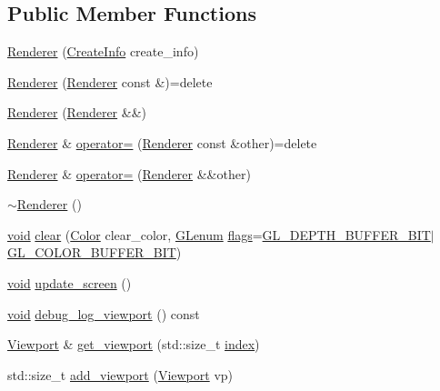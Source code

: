 \subsection*{Public Member Functions}
\begin{DoxyCompactItemize}
\item 
\mbox{\hyperlink{class_saturn_1_1_renderer_a15cfd7d5ff3e992daebf52b81e6f3168}{Renderer}} (\mbox{\hyperlink{struct_saturn_1_1_renderer_1_1_create_info}{Create\+Info}} create\+\_\+info)
\item 
\mbox{\hyperlink{class_saturn_1_1_renderer_ad83d9c451cfdcb522e67909fb5b8f41b}{Renderer}} (\mbox{\hyperlink{class_saturn_1_1_renderer}{Renderer}} const \&)=delete
\item 
\mbox{\hyperlink{class_saturn_1_1_renderer_a4ef1880dcbcd08a0577bf94848685e96}{Renderer}} (\mbox{\hyperlink{class_saturn_1_1_renderer}{Renderer}} \&\&)
\item 
\mbox{\hyperlink{class_saturn_1_1_renderer}{Renderer}} \& \mbox{\hyperlink{class_saturn_1_1_renderer_aa07681b99dac69ffa21d515a17a60d0f}{operator=}} (\mbox{\hyperlink{class_saturn_1_1_renderer}{Renderer}} const \&other)=delete
\item 
\mbox{\hyperlink{class_saturn_1_1_renderer}{Renderer}} \& \mbox{\hyperlink{class_saturn_1_1_renderer_a951aa53f75af86f17e977bc79e44e6ba}{operator=}} (\mbox{\hyperlink{class_saturn_1_1_renderer}{Renderer}} \&\&other)
\item 
\mbox{\hyperlink{class_saturn_1_1_renderer_a85a39370bbc9275e04030aa45cd648ef}{$\sim$\+Renderer}} ()
\item 
\mbox{\hyperlink{glad_8h_a950fc91edb4504f62f1c577bf4727c29}{void}} \mbox{\hyperlink{class_saturn_1_1_renderer_a03a54596c475908430be7215ffbc85e9}{clear}} (\mbox{\hyperlink{class_saturn_1_1_color}{Color}} clear\+\_\+color, \mbox{\hyperlink{glad_8h_a5d5233918a454ad3975c620a69ac5f0b}{G\+Lenum}} \mbox{\hyperlink{glad_8h_ac7ba7d3cce3d19ca020e056b37231289}{flags}}=\mbox{\hyperlink{glad_8h_aef2a9e9a4b130bc4de57514327847b4f}{G\+L\+\_\+\+D\+E\+P\+T\+H\+\_\+\+B\+U\+F\+F\+E\+R\+\_\+\+B\+IT}}$\vert$\mbox{\hyperlink{glad_8h_a947db9ff944c4b78e652144c3dd1060c}{G\+L\+\_\+\+C\+O\+L\+O\+R\+\_\+\+B\+U\+F\+F\+E\+R\+\_\+\+B\+IT}})
\item 
\mbox{\hyperlink{glad_8h_a950fc91edb4504f62f1c577bf4727c29}{void}} \mbox{\hyperlink{class_saturn_1_1_renderer_a6332346e6ceb8802a98387d9c7c41515}{update\+\_\+screen}} ()
\item 
\mbox{\hyperlink{glad_8h_a950fc91edb4504f62f1c577bf4727c29}{void}} \mbox{\hyperlink{class_saturn_1_1_renderer_a79c8a965dc33001d6f70b41b77c884f1}{debug\+\_\+log\+\_\+viewport}} () const
\item 
\mbox{\hyperlink{class_saturn_1_1_viewport}{Viewport}} \& \mbox{\hyperlink{class_saturn_1_1_renderer_a98f0dd7d91ed42aa0816b67a2b3cff90}{get\+\_\+viewport}} (std\+::size\+\_\+t \mbox{\hyperlink{glad_8h_ab47dd9958bcadea08866b42bf358e95e}{index}})
\item 
std\+::size\+\_\+t \mbox{\hyperlink{class_saturn_1_1_renderer_a9421498196d89c8574fa8cf94967b91e}{add\+\_\+viewport}} (\mbox{\hyperlink{class_saturn_1_1_viewport}{Viewport}} vp)
\end{DoxyCompactItemize}


